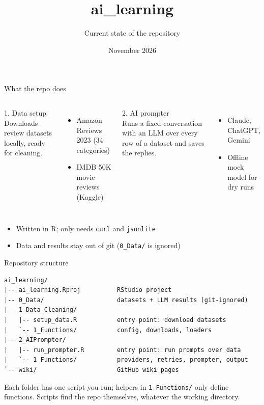 \documentclass[aspectratio=169,10pt]{beamer}
\title{ai\_learning}
\subtitle{Current state of the repository}
\date{November 2026}
\newcommand{\code}[1]{\texttt{#1}}
\begin{document}
\maketitle

\begin{frame}{What the repo does}
  \begin{columns}[T]
      \alert{1. Data setup} \\[2pt]
      Downloads review datasets locally, ready for cleaning.
      \begin{itemize}
        \item Amazon Reviews 2023 (34 categories)
        \item IMDB 50K movie reviews (Kaggle)
      \end{itemize}
      \alert{2. AI prompter} \\[2pt]
      Runs a fixed conversation with an LLM over every row of a dataset and saves the replies.
      \begin{itemize}
        \item Claude, ChatGPT, Gemini
        \item Offline mock model for dry runs
      \end{itemize}
  \end{columns}
  \vfill
  \begin{itemize}
    \item Written in \alert{R}; only needs \code{curl} and \code{jsonlite}
    \item Data and results stay \alert{out of git} (\code{0\_Data/} is ignored)
  \end{itemize}
\end{frame}

\begin{frame}[fragile]{Repository structure}
\begin{lstlisting}[language={}, columns=fixed, basicstyle=\ttfamily\footnotesize]
ai_learning/
|-- ai_learning.Rproj          RStudio project
|-- 0_Data/                    datasets + LLM results (git-ignored)
|-- 1_Data_Cleaning/
|   |-- setup_data.R           entry point: download datasets
|   `-- 1_Functions/           config, downloads, loaders
|-- 2_AIPrompter/
|   |-- run_prompter.R         entry point: run prompts over data
|   `-- 1_Functions/           providers, retries, prompter, output
`-- wiki/                      GitHub wiki pages
\end{lstlisting}
  \vspace{4pt}
  Each folder has \alert{one script you run}; helpers in \code{1\_Functions/} only define functions.
  Scripts find the repo themselves, whatever the working directory.
\end{frame}
\end{document}
